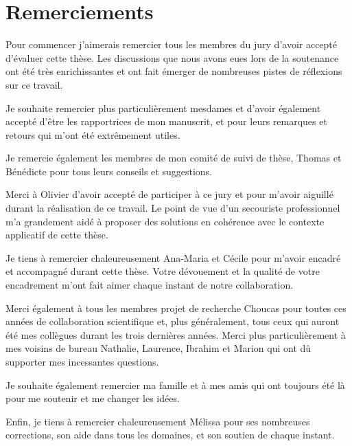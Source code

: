 \section*{Remerciements}

Pour commencer j'aimerais remercier tous les membres du jury d'avoir
accepté d'évaluer cette thèse. Les discussions que nous avons eues
lors de la soutenance ont été très enrichissantes et ont fait émerger
de nombreuses pistes de réflexions sur ce travail.

\vspace{.25cm}

Je souhaite remercier plus particulièrement mesdames
 et  d'avoir également accepté
d'être les rapportrices de mon manuscrit, et pour leurs remarques et
retours qui m'ont été extrêmement utiles.

\vspace{.25cm}

Je remercie également les membres de mon comité de suivi de thèse,
Thomas  et Bénédicte  pour tous leurs
conseils et suggestions.

\vspace{.25cm}

Merci à Olivier  d'avoir accepté de participer à ce jury et
pour m'avoir aiguillé durant la réalisation de ce travail. Le point de
vue d'un secouriste professionnel m'a grandement aidé à proposer des
solutions en cohérence avec le contexte applicatif de cette thèse.

\vspace{.25cm}

Je tiens à remercier chaleureusement Ana-Maria 
et Cécile  pour m'avoir encadré et accompagné durant
cette thèse. Votre dévouement et la qualité de votre encadrement m'ont
fait aimer chaque instant de notre collaboration.  

\vspace{.25cm}

Merci également à tous les membres projet de recherche Choucas pour
toutes ces années de collaboration scientifique et, plus généralement,
tous ceux qui auront été mes collègues durant les trois dernières
années. Merci plus particulièrement à mes voisins de bureau Nathalie,
Laurence, Ibrahim et Marion qui ont dû supporter mes incessantes
questions.

\vspace{.25cm}

Je souhaite également remercier ma famille et à mes amis qui ont
toujours été là pour me soutenir et me changer les idées.

\vspace{.25cm}

Enfin, je tiens à remercier chaleureusement Mélissa pour ses
nombreuses corrections, son aide dans tous les domaines, et son
soutien de chaque instant.

